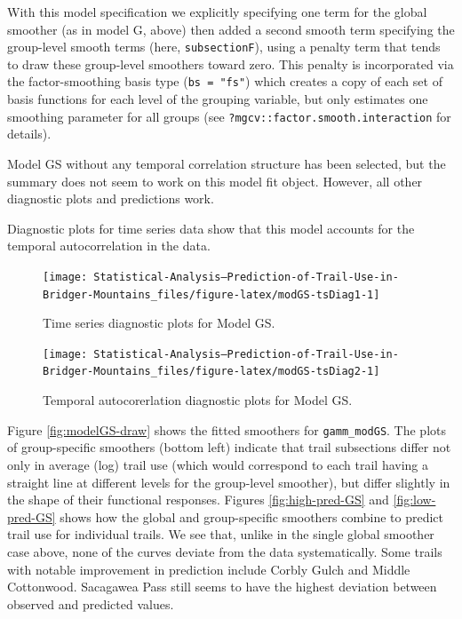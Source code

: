 \documentclass[
]{book}
\begin{document}
With this model specification we explicitly specifying one term for the global smoother (as in model G, above) then added a second smooth term specifying the group-level smooth terms (here, \texttt{subsectionF}), using a penalty term that tends to draw these group-level smoothers toward zero. This penalty is incorporated via the factor-smoothing basis type (\texttt{bs\ =\ "fs"}) which creates a copy of each set of basis functions for each level of the grouping variable, but only estimates one smoothing parameter for all groups (see \texttt{?mgcv::factor.smooth.interaction} for details).

Model GS without any temporal correlation structure has been selected, but the summary does not seem to work on this model fit object. However, all other diagnostic plots and predictions work.

Diagnostic plots for time series data show that this model accounts for the temporal autocorrelation in the data.

\begin{figure}

{\centering \texttt{[image: Statistical-Analysis--Prediction-of-Trail-Use-in-Bridger-Mountains\_files/figure-latex/modGS-tsDiag1-1]} 

}

\caption{Time series diagnostic plots for Model GS.}\label{fig:modGS-tsDiag1}
\end{figure}

\begin{figure}

{\centering \texttt{[image: Statistical-Analysis--Prediction-of-Trail-Use-in-Bridger-Mountains\_files/figure-latex/modGS-tsDiag2-1]} 

}

\caption{Temporal autocorerlation diagnostic plots for Model GS.}\label{fig:modGS-tsDiag2}
\end{figure}

Figure \ref{fig:modelGS-draw} shows the fitted smoothers for \texttt{gamm\_modGS}. The plots of group-specific smoothers (bottom left) indicate that trail subsections differ not only in average (log) trail use (which would correspond to each trail having a straight line at different levels for the group-level smoother), but differ slightly in the shape of their functional responses. Figures \ref{fig:high-pred-GS} and \ref{fig:low-pred-GS} shows how the global and group-specific smoothers combine to predict trail use for individual trails. We see that, unlike in the single global smoother case above, none of the curves deviate from the data systematically. Some trails with notable improvement in prediction include Corbly Gulch and Middle Cottonwood. Sacagawea Pass still seems to have the highest deviation between observed and predicted values.
\end{document}
